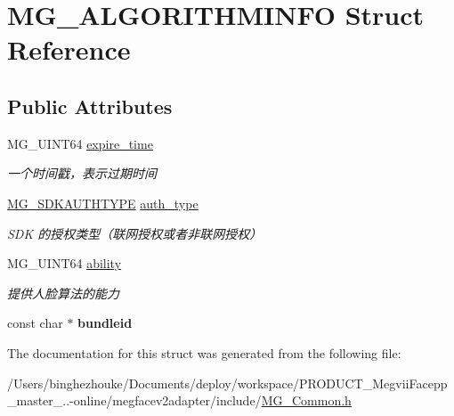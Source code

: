 \hypertarget{struct_m_g___a_l_g_o_r_i_t_h_m_i_n_f_o}{}\section{M\+G\+\_\+\+A\+L\+G\+O\+R\+I\+T\+H\+M\+I\+N\+FO Struct Reference}
\label{struct_m_g___a_l_g_o_r_i_t_h_m_i_n_f_o}
\subsection*{Public Attributes}
\begin{DoxyCompactItemize}
\item 
\mbox{\label{struct_m_g___a_l_g_o_r_i_t_h_m_i_n_f_o_ae83555e95ae8b6390dd8485aec3ad91c}} 
M\+G\+\_\+\+U\+I\+N\+T64 \hyperlink{struct_m_g___a_l_g_o_r_i_t_h_m_i_n_f_o_ae83555e95ae8b6390dd8485aec3ad91c}{expire\+\_\+time}
\begin{DoxyCompactList}\small\item\em 一个时间戳，表示过期时间 \end{DoxyCompactList}\item 
\mbox{\label{struct_m_g___a_l_g_o_r_i_t_h_m_i_n_f_o_a0b212c9a94ccffa74a129d0429950295}} 
\hyperlink{_m_g___common_8h_a3ee48a4a8bc6440c8f21fae5dfcded4c}{M\+G\+\_\+\+S\+D\+K\+A\+U\+T\+H\+T\+Y\+PE} \hyperlink{struct_m_g___a_l_g_o_r_i_t_h_m_i_n_f_o_a0b212c9a94ccffa74a129d0429950295}{auth\+\_\+type}
\begin{DoxyCompactList}\small\item\em S\+DK 的授权类型（联网授权或者非联网授权） \end{DoxyCompactList}\item 
\mbox{\label{struct_m_g___a_l_g_o_r_i_t_h_m_i_n_f_o_a11625766f5876f3f64b74cb209888c63}} 
M\+G\+\_\+\+U\+I\+N\+T64 \hyperlink{struct_m_g___a_l_g_o_r_i_t_h_m_i_n_f_o_a11625766f5876f3f64b74cb209888c63}{ability}
\begin{DoxyCompactList}\small\item\em 提供人脸算法的能力 \end{DoxyCompactList}\item 
\mbox{\label{struct_m_g___a_l_g_o_r_i_t_h_m_i_n_f_o_a9915dccde061cc6e2764a1a42e7a23e6}} 
const char $\ast$ {\bfseries bundleid}
\end{DoxyCompactItemize}


The documentation for this struct was generated from the following file\+:\begin{DoxyCompactItemize}
\item 
/\+Users/binghezhouke/\+Documents/deploy/workspace/\+P\+R\+O\+D\+U\+C\+T\+\_\+\+Megvii\+Facepp\+\_\+master\+\_..-\/online/megfacev2adapter/include/\hyperlink{_m_g___common_8h}{M\+G\+\_\+\+Common.\+h}\end{DoxyCompactItemize}
